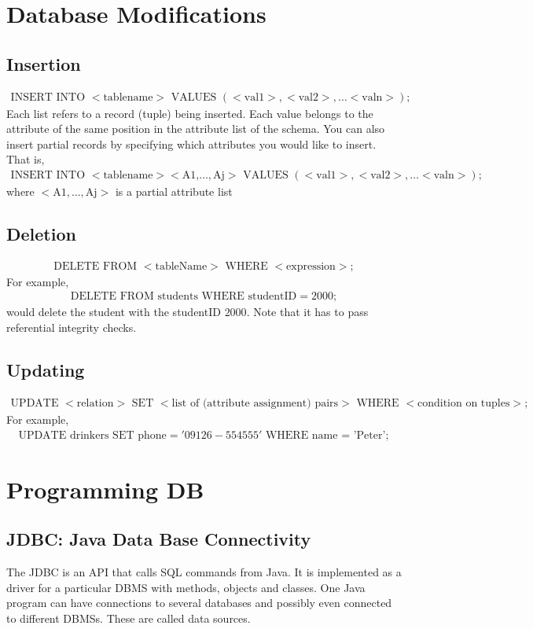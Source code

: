 \documentclass[a4paper]{article}
\theoremstyle{plain}
\theoremstyle{definition}
\theoremstyle{remark}
\begin{document}
\section{Database Modifications}
\subsection{Insertion}
\begin{align*}
	\text{INSERT INTO }<\text{tablename}>\text{ VALUES }(<\text{val1}>,<\text{val2}>,\ldots<\text{valn}>);
\end{align*}
Each list refers to a record (tuple) being inserted. Each value belongs to the attribute of the same position in the attribute list of the schema. You can also insert partial records by specifying which attributes you would like to insert. That is,
\begin{align*}
	\text{INSERT INTO }<\text{tablename}> <\text{A1,}\ldots,\text{Aj}>\text{ VALUES }(<\text{val1}>,<\text{val2}>,\ldots<\text{valn}>);
\end{align*}
where $<\text{A1},\ldots,\text{Aj}>$ is a partial attribute list
\subsection{Deletion}
\begin{align*}
	\text{DELETE FROM }<\text{tableName}> \text{ WHERE } <\text{expression}>;
\end{align*}
For example,
\begin{align*}
	\text{DELETE FROM students WHERE studentID}=2000;
\end{align*}
would delete the student with the studentID $2000$. Note that it has to pass referential integrity checks.
\subsection{Updating}
\begin{align*}
	\text{UPDATE } <\text{relation}> \text{ SET }<\text{list of (attribute assignment) pairs}> \text{ WHERE } <\text{condition on tuples}>;
\end{align*}
For example,
\begin{align*}
	\text{UPDATE drinkers SET phone}='09126-554555'\text{ WHERE name = 'Peter'};
\end{align*}
\section{Programming DB}
\subsection{JDBC: Java Data Base Connectivity}
The JDBC is an API that calls SQL commands from Java. It is implemented as a driver for a particular DBMS with methods, objects and classes. One Java program can have connections to several databases and possibly even connected to different DBMSs. These are called data sources. \\
\end{document}
